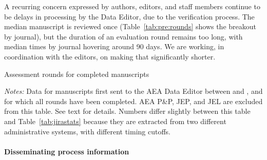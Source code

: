 A recurring concern expressed by authors, editors, and staff members continue to be delays in processing by the Data Editor, due to the verification process. The median manuscript is reviewed once (Table~\ref{tab:pre:rounds} shows the breakout by journal), but the duration of an evaluation round remains too long, with median times by journal hovering around  90 days. We are working, in coordination with the editors, on making that significantly shorter.
%



\begin{table}
    \centering
    \caption{Assessment rounds for completed manuscripts}
    \label{tab:pre:rounds}
    \begin{threeparttable}
    \centering
    
    \begin{tablenotes}
    \footnotesize
    \item[] \textit{Notes:} Data for manuscripts first sent to the AEA Data Editor between \firstday{} and \lastday{}, and for which all rounds have been completed. AEA P\&P, JEP, and JEL are excluded from this table. See text for details. Numbers differ slightly between this table and Table~\ref{tab:jirastats} because they are extracted from two different administrative systems, with different timing cutoffs.
    \end{tablenotes}
 \end{threeparttable}
\end{table}


\paragraph{Disseminating process information}

